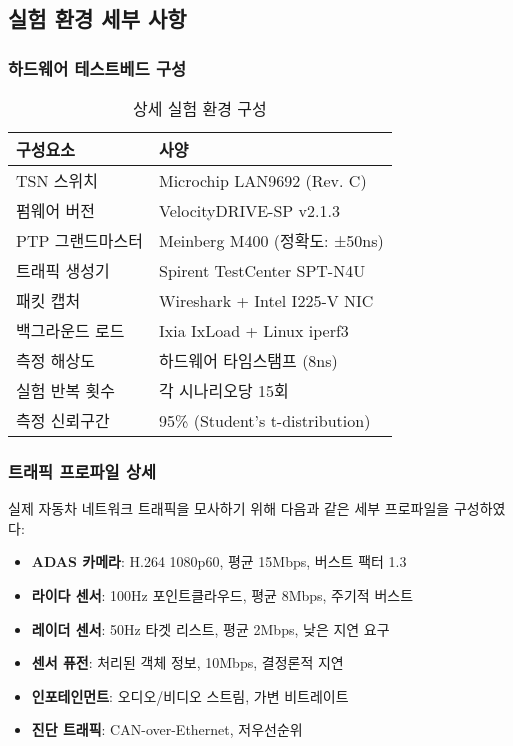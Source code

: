 \documentclass[10pt, journal, compsoc]{IEEEtran}
\begin{document}
\subsection{실험 환경 세부 사항}

\subsubsection{하드웨어 테스트베드 구성}

\begin{table}[h]
\centering
\caption{상세 실험 환경 구성}
\label{tab:detailed_testbed}
\begin{tabular}{ll}
\toprule
\textbf{구성요소} & \textbf{사양} \\
\midrule
TSN 스위치 & Microchip LAN9692 (Rev. C) \\
펌웨어 버전 & VelocityDRIVE-SP v2.1.3 \\
PTP 그랜드마스터 & Meinberg M400 (정확도: ±50ns) \\
트래픽 생성기 & Spirent TestCenter SPT-N4U \\
패킷 캡처 & Wireshark + Intel I225-V NIC \\
백그라운드 로드 & Ixia IxLoad + Linux iperf3 \\
측정 해상도 & 하드웨어 타임스탬프 (8ns) \\
실험 반복 횟수 & 각 시나리오당 15회 \\
측정 신뢰구간 & 95\% (Student's t-distribution) \\
\bottomrule
\end{tabular}
\end{table}

\subsubsection{트래픽 프로파일 상세}

실제 자동차 네트워크 트래픽을 모사하기 위해 다음과 같은 세부 프로파일을 구성하였다:

\begin{itemize}
    \item \textbf{ADAS 카메라}: H.264 1080p60, 평균 15Mbps, 버스트 팩터 1.3
    \item \textbf{라이다 센서}: 100Hz 포인트클라우드, 평균 8Mbps, 주기적 버스트
    \item \textbf{레이더 센서}: 50Hz 타겟 리스트, 평균 2Mbps, 낮은 지연 요구
    \item \textbf{센서 퓨전}: 처리된 객체 정보, 10Mbps, 결정론적 지연
    \item \textbf{인포테인먼트}: 오디오/비디오 스트림, 가변 비트레이트
    \item \textbf{진단 트래픽}: CAN-over-Ethernet, 저우선순위
\end{itemize}
\end{document}
